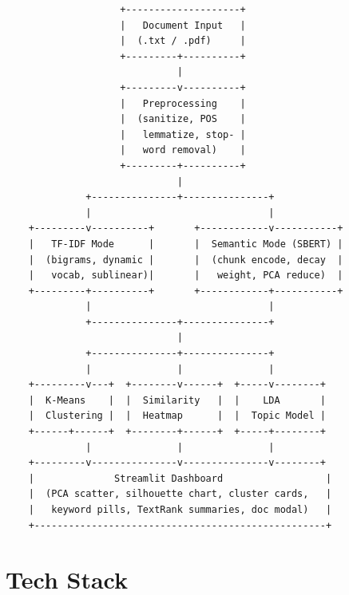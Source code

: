 \documentclass[12pt, a4paper]{article}
\begin{document}
\begin{verbatim}
                    +--------------------+
                    |   Document Input   |
                    |  (.txt / .pdf)     |
                    +---------+----------+
                              |
                    +---------v----------+
                    |   Preprocessing    |
                    |  (sanitize, POS    |
                    |   lemmatize, stop- |
                    |   word removal)    |
                    +---------+----------+
                              |
              +---------------+---------------+
              |                               |
    +---------v----------+       +------------v-----------+
    |   TF-IDF Mode      |       |  Semantic Mode (SBERT) |
    |  (bigrams, dynamic |       |  (chunk encode, decay  |
    |   vocab, sublinear)|       |   weight, PCA reduce)  |
    +---------+----------+       +------------+-----------+
              |                               |
              +---------------+---------------+
                              |
              +---------------+---------------+
              |               |               |
    +---------v---+  +--------v------+  +-----v--------+
    |  K-Means    |  |  Similarity   |  |    LDA       |
    |  Clustering |  |  Heatmap      |  |  Topic Model |
    +------+------+  +--------+------+  +-----+--------+
              |               |               |
    +---------v---------------v---------------v--------+
    |              Streamlit Dashboard                  |
    |  (PCA scatter, silhouette chart, cluster cards,   |
    |   keyword pills, TextRank summaries, doc modal)   |
    +---------------------------------------------------+
\end{verbatim}

\section{Tech Stack}
\end{document}
